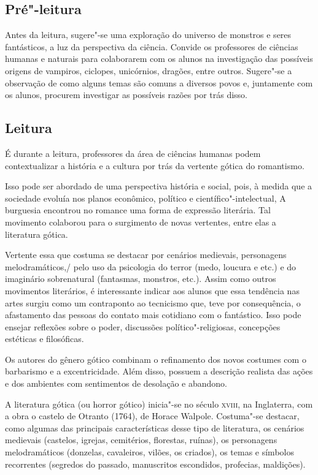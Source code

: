 \documentclass[12pt]{extarticle}
\begin{document}

\subsection{Pré"-leitura}

Antes da leitura, sugere"-se uma exploração do universo de
monstros e seres fantásticos, a luz da perspectiva da ciência. Convide
os professores de ciências humanas e naturais para colaborarem com os
alunos na investigação das possíveis origens de vampiros, ciclopes,
unicórnios, dragões, entre outros. Sugere"-se a observação de como alguns
temas são comuns a diversos povos e, juntamente com os alunos, procurem
investigar as possíveis razões por trás disso.


\subsection{Leitura}

É durante a leitura, professores da área de ciências humanas
podem contextualizar a história e a cultura por trás da vertente gótica
do romantismo.

Isso pode ser abordado de uma perspectiva história e social, pois, à
medida que a sociedade evoluía nos planos econômico, político e
científico"-intelectual, A burguesia encontrou no romance uma forma de
expressão literária. Tal movimento colaborou para o surgimento de novas
vertentes, entre elas a literatura gótica.

Vertente essa que costuma se destacar por cenários medievais,
personagens melodramáticos,/ pelo uso da psicologia do terror (medo,
loucura e etc.) e do imaginário sobrenatural (fantasmas, monstros,
etc.). Assim como outros movimentos literários, é interessante indicar
aos alunos que essa tendência nas artes surgiu como um contraponto ao
tecnicismo que, teve por consequência, o afastamento das pessoas do
contato mais cotidiano com o fantástico. Isso pode ensejar reflexões
sobre o poder, discussões político"-religiosas, concepções estéticas e
filosóficas.

Os autores do gênero gótico combinam o refinamento dos novos costumes
com o barbarismo e a excentricidade. Além disso, possuem a descrição
realista das ações e dos ambientes com sentimentos de desolação e
abandono.

A literatura gótica (ou horror gótico) inicia"-se no século \textsc{xviii}, na
Inglaterra, com a obra o castelo de Otranto (1764), de Horace Walpole.
Costuma"-se destacar, como algumas das principais características desse
tipo de literatura, os cenários medievais (castelos, igrejas,
cemitérios, florestas, ruínas), os personagens melodramáticos (donzelas,
cavaleiros, vilões, os criados), os temas e símbolos recorrentes
(segredos do passado, manuscritos escondidos, profecias, maldições).
\end{document}
